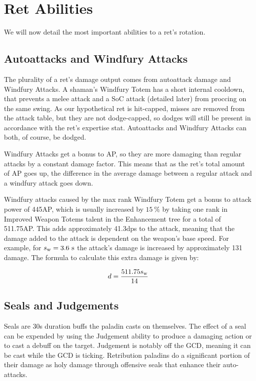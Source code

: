 \documentclass[letterpaper,11pt]{article}
\begin{document}
	\section{Ret Abilities}
	We will now detail the most important abilities to a ret's rotation.

	\subsection{Autoattacks and Windfury Attacks}
	The plurality of a ret's damage output comes from autoattack damage and Windfury Attacks.
	A shaman's Windfury Totem has a short internal cooldown, that prevents a melee attack and a SoC attack (detailed later) from proccing on the same swing.
	As our hypothetical ret is hit-capped, misses are removed from the attack table, but they are
	not dodge-capped, so dodges will still be present in accordance with the ret's expertise stat.
	Autoattacks and Windfury Attacks can both, of course, be dodged.
	
	Windfury Attacks get a bonus to AP, so they are more damaging than regular attacks by a constant damage factor.
	This means that as the ret's total amount of AP goes up, the difference in the average damage between a regular attack and a windfury attack goes down.
	
	Windfury attacks caused by the max rank Windfury Totem get a bonus to attack power of 445AP, which is usually increased by $15~\%$ by taking one rank in Improved Weapon Totems talent in the Enhancement tree for a total of 511.75AP.
	This adds approximately 41.3dps to the attack, meaning that the damage added to the attack is dependent on the weapon's base speed.
	For example, for $s_\mathrm{w}  = 3.6~\mathrm{s}$ the attack's damage is increased by approximately 131 damage.
	The formula to calculate this extra damage is given by:
	
	\begin{equation}
		d = \frac{511.75 s_\mathrm{w} }{14}
	\end{equation}
	
	\subsection{Seals and Judgements}
	Seals are 30s duration buffs the paladin casts on themselves.
	The effect of a seal can be expended by using the Judgement ability to produce a damaging action or to cast a debuff on the target.
	Judgement is notably off the GCD, meaning it can be cast while the GCD is ticking.
	Retribution paladins do a significant portion of their damage as holy damage through offensive seals that enhance their auto-attacks.
\end{document}
